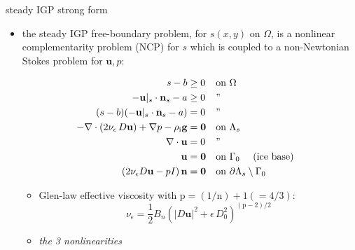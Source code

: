 \documentclass[usepdftitle=false,usenames,dvipsnames]{beamer}
\newcommand{\tikzmark}[1]{\tikz[overlay,remember picture] \node (#1) {};}
\newcommand{\eps}{\epsilon}
\newcommand{\bn}{\mathbf{n}}
\newcommand{\bu}{\mathbf{u}}
\newcommand{\bzero}{\bm{0}}
\newcommand{\rhoi}{\rho_{\text{i}}}
\newcommand{\pp}{{\text{p}}}
\begin{document}
\begin{frame}{steady IGP strong form}

\begin{itemize}
\item the steady IGP free-boundary problem, for $s(x,y)$ on $\Omega$, is a \alert{nonlinear complementarity problem (NCP) for $s$ which is coupled to a non-Newtonian Stokes problem for $\bu,p$:}

\vspace{-5mm}

\begin{align*}
s - b &\ge 0 && \text{on $\Omega$} & \tikzmark{ncptop} \\
- \bu|_s \cdot \bn_s - a &\ge 0 && \text{''} \\
(s - b) (- \bu|_s \cdot \bn_s - a) &= 0 && \text{''} & \tikzmark{ncpbot} \\
- \nabla \cdot \left(2 \nu_\eps\, D\bu\right) + \nabla p - \rhoi \mathbf{g} &= \bzero && \text{on $\Lambda_s$} & \tikzmark{gstop} \\
\nabla \cdot \bu &= 0 && \text{''} \\
\bu &= \bzero && \text{on $\Gamma_0$ \quad (ice base)} \\
\left(2 \nu_\eps D\bu - pI\right) \bn &= \bzero && \text{on $\partial \Lambda_s \setminus \Gamma_0$} & \tikzmark{gsbot}
\end{align*}



\vspace{-8mm}

    \begin{itemize}
    \item Glen-law effective viscosity with $\text{p}=(1/\text{n})+1(=4/3)$:
      $$\nu_\eps = \frac{1}{2} B_n \left(|D\bu|^2 + \eps\, D_0^2\right)^{(\pp-2)/2}$$
    \item \alert{\emph{the 3 nonlinearities}}
    \end{itemize}
\end{itemize}
\end{frame}
\end{document}

